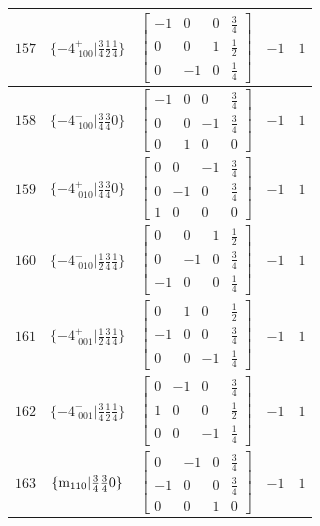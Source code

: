 \documentclass[fleqn,8pt]{jsarticle}
\begin{document}
\begin{longtable}{ccccc}
$ 157 $ & $ \{-4^{+}_{\,\,100}|\frac{3}{4} \frac{1}{2} \frac{1}{4}\} $ & $ \begin{bmatrix} -1 & 0 & 0 & \frac{3}{4} \\ 0 & 0 & 1 & \frac{1}{2} \\ 0 & -1 & 0 & \frac{1}{4} \end{bmatrix} $ & $ -1 $ & $ 1 $ \\ \hline
$ 158 $ & $ \{-4^{-}_{\,\,100}|\frac{3}{4} \frac{3}{4} 0\} $ & $ \begin{bmatrix} -1 & 0 & 0 & \frac{3}{4} \\ 0 & 0 & -1 & \frac{3}{4} \\ 0 & 1 & 0 & 0 \end{bmatrix} $ & $ -1 $ & $ 1 $ \\ \hline
$ 159 $ & $ \{-4^{+}_{\,\,010}|\frac{3}{4} \frac{3}{4} 0\} $ & $ \begin{bmatrix} 0 & 0 & -1 & \frac{3}{4} \\ 0 & -1 & 0 & \frac{3}{4} \\ 1 & 0 & 0 & 0 \end{bmatrix} $ & $ -1 $ & $ 1 $ \\ \hline
$ 160 $ & $ \{-4^{-}_{\,\,010}|\frac{1}{2} \frac{3}{4} \frac{1}{4}\} $ & $ \begin{bmatrix} 0 & 0 & 1 & \frac{1}{2} \\ 0 & -1 & 0 & \frac{3}{4} \\ -1 & 0 & 0 & \frac{1}{4} \end{bmatrix} $ & $ -1 $ & $ 1 $ \\ \hline
$ 161 $ & $ \{-4^{+}_{\,\,001}|\frac{1}{2} \frac{3}{4} \frac{1}{4}\} $ & $ \begin{bmatrix} 0 & 1 & 0 & \frac{1}{2} \\ -1 & 0 & 0 & \frac{3}{4} \\ 0 & 0 & -1 & \frac{1}{4} \end{bmatrix} $ & $ -1 $ & $ 1 $ \\ \hline
$ 162 $ & $ \{-4^{-}_{\,\,001}|\frac{3}{4} \frac{1}{2} \frac{1}{4}\} $ & $ \begin{bmatrix} 0 & -1 & 0 & \frac{3}{4} \\ 1 & 0 & 0 & \frac{1}{2} \\ 0 & 0 & -1 & \frac{1}{4} \end{bmatrix} $ & $ -1 $ & $ 1 $ \\ \hline
$ 163 $ & $ \{{\rm m}_{110}|\frac{3}{4} \frac{3}{4} 0\} $ & $ \begin{bmatrix} 0 & -1 & 0 & \frac{3}{4} \\ -1 & 0 & 0 & \frac{3}{4} \\ 0 & 0 & 1 & 0 \end{bmatrix} $ & $ -1 $ & $ 1 $ \\ \hline

\end{longtable}
\end{document}
